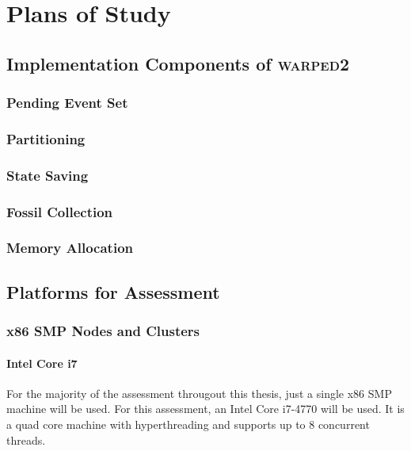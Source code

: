 \documentclass[11pt]{book}
\begin{document}
\chapter{Plans of Study}\label{plans_of_study}

\section{Implementation Components of \textsc{warped2}}

\subsection{Pending Event Set}

\subsection{Partitioning}

\subsection{State Saving}

\subsection{Fossil Collection}

\subsection{Memory Allocation}

\section{Platforms for Assessment}

\subsection{x86 SMP Nodes and Clusters}

\subsubsection{Intel Core i7}

For the majority of the assessment througout this thesis, just a single x86 SMP machine
will be used. For this assessment, an Intel Core i7-4770 will be used. It is a quad core
machine with hyperthreading and supports up to 8 concurrent threads.
\end{document}
